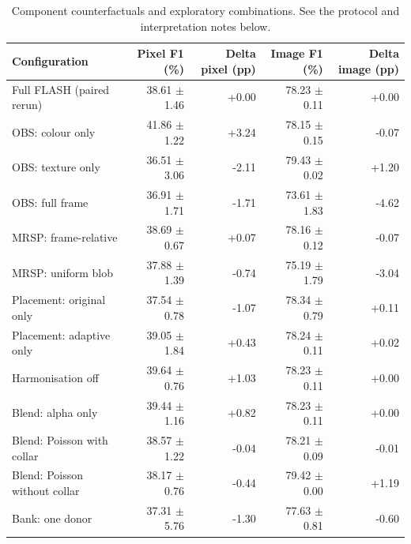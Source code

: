
\begin{table}[t]
\centering
\scriptsize
\caption{Component counterfactuals and exploratory combinations. See the protocol and interpretation notes below.}
\begin{tabular}{lrrrr}
\hline
Configuration & Pixel F1 (\%) & Delta pixel (pp) & Image F1 (\%) & Delta image (pp) \\
\hline
Full FLASH (paired rerun) & 38.61 $\pm$ 1.46 & +0.00 & 78.23 $\pm$ 0.11 & +0.00 \\
OBS: colour only & 41.86 $\pm$ 1.22 & +3.24 & 78.15 $\pm$ 0.15 & -0.07 \\
OBS: texture only & 36.51 $\pm$ 3.06 & -2.11 & 79.43 $\pm$ 0.02 & +1.20 \\
OBS: full frame & 36.91 $\pm$ 1.71 & -1.71 & 73.61 $\pm$ 1.83 & -4.62 \\
MRSP: frame-relative & 38.69 $\pm$ 0.67 & +0.07 & 78.16 $\pm$ 0.12 & -0.07 \\
MRSP: uniform blob & 37.88 $\pm$ 1.39 & -0.74 & 75.19 $\pm$ 1.79 & -3.04 \\
Placement: original only & 37.54 $\pm$ 0.78 & -1.07 & 78.34 $\pm$ 0.79 & +0.11 \\
Placement: adaptive only & 39.05 $\pm$ 1.84 & +0.43 & 78.24 $\pm$ 0.11 & +0.02 \\
Harmonisation off & 39.64 $\pm$ 0.76 & +1.03 & 78.23 $\pm$ 0.11 & +0.00 \\
Blend: alpha only & 39.44 $\pm$ 1.16 & +0.82 & 78.23 $\pm$ 0.11 & +0.00 \\
Blend: Poisson with collar & 38.57 $\pm$ 1.22 & -0.04 & 78.21 $\pm$ 0.09 & -0.01 \\
Blend: Poisson without collar & 38.17 $\pm$ 0.76 & -0.44 & 79.42 $\pm$ 0.00 & +1.19 \\
Bank: one donor & 37.31 $\pm$ 5.76 & -1.30 & 77.63 $\pm$ 0.81 & -0.60 \\

\end{tabular}
\end{table}
